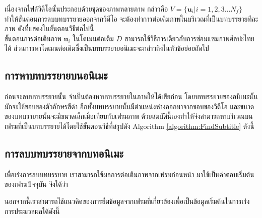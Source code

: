 \hspace{1cm}เนื่องจากไฟล์วิดีโอนั้นประกอบด้วยชุดของภาพหลายภาพ กล่าวคือ $V = \{\boldsymbol{u}_i| i = 1,2,3 ... N_f\}$ ทำให้ขั้นตอนการลบบทบรรยายออกจากวิดีโอ จะต้องทำการต่อเติมภาพในบริเวณที่เป็นบทบรรยายทีละภาพ \break ดังที่แสดงในขั้นตอนวิธีต่อไปนี้ \\
	


\vspace{1cm}
\hspace{1cm} ขั้นตอนการต่อเติมภาพ $\boldsymbol{u}_i$ ในโดเมนต่อเติม $D$ สามารถใช้วิธีการเดียวกับการซ่อมแซมภาพศิลปะไทยได้ ส่วนการหาโดเมนต่อเติมซึ่งเป็นบทบรรยายอนิเมะจะกล่าวถึงในหัวข้อย่อยถัดไป

\subsection{การหาบทบรรยายบนอนิเมะ}	
\hspace{1cm}ก่อนจะลบบทบรรยายนั้น จำเป็นต้องหาบทบรรยายในภาพให้ได้เสียก่อน โดยบทบรรยายของอนิเมะนั้น มักจะใช้ขอบของตัวอักษรสีดำ อีกทั้งบทบรรยายนั้นมีตำแหน่งห่างออกมาจากขอบของวิดีโอ และขนาดของบทบรรยายนั้นจะมีขนาดเล็กเมื่อเทียบกับเฟรมภาพ ด้วยสมบัตินี้เองทำให้จึงสามารถหาบริเวณบนเฟรมที่เป็นบทบรรยายได้โดยใช้ขั้นตอนวิธีที่สรุปดัง Algorithm \ref{algorithm:FindSubtitle} ดังนี้
	
\vspace{1cm}



\subsection{การลบบทบรรยายจากบทอนิเมะ}

\hspace{1cm} เพื่อเร่งการลบบทบรรยาย เราสามารถใช้ผลการต่อเติมภาพจากเฟรมก่อนหน้า มาใช้เป็นคำตอบเริ่มต้นของเฟรมปัจจุบัน จึงได้ว่า\\
	
\vspace{0.5cm}

\vspace{0.5cm}



\vspace{0.5cm}	
\hspace{1cm} นอกจากนี้เราสามารถใช้แนวคิดของการยืมข้อมูลจากเฟรมที่เกี่ยวข้องเพื่อเป็นข้อมูลเริ่มต้นในการเร่งการประมวลผลได้ดังนี้ \\
	
\vspace{0.5cm}

 
\vspace{0.5cm}

\vspace{0.5cm}

\vspace{0.5cm}


